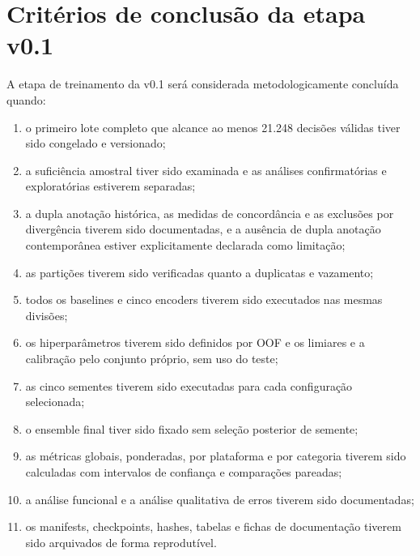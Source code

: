 \section{Critérios de conclusão da etapa v0.1}
\label{sec:criterios-conclusao}

A etapa de treinamento da v0.1 será considerada metodologicamente concluída
quando:

\begin{enumerate}
    \item o primeiro lote completo que alcance ao menos 21.248 decisões válidas
    tiver sido congelado e versionado;
    \item a suficiência amostral tiver sido examinada e as análises confirmatórias
    e exploratórias estiverem separadas;
    \item a dupla anotação histórica, as medidas de concordância e as exclusões
    por divergência tiverem sido documentadas, e a ausência de dupla anotação
    contemporânea estiver explicitamente declarada como limitação;
    \item as partições tiverem sido verificadas quanto a duplicatas e vazamento;
    \item todos os baselines e cinco encoders tiverem sido executados nas mesmas
    divisões;
    \item os hiperparâmetros tiverem sido definidos por OOF e os limiares e a
    calibração pelo conjunto próprio, sem uso do teste;
    \item as cinco sementes tiverem sido executadas para cada configuração
    selecionada;
    \item o ensemble final tiver sido fixado sem seleção posterior de semente;
    \item as métricas globais, ponderadas, por plataforma e por categoria
    tiverem sido calculadas com intervalos de confiança e comparações pareadas;
    \item a análise funcional e a análise qualitativa de erros tiverem sido
    documentadas;
    \item os manifests, checkpoints, hashes, tabelas e fichas de documentação
    tiverem sido arquivados de forma reprodutível.
\end{enumerate}


